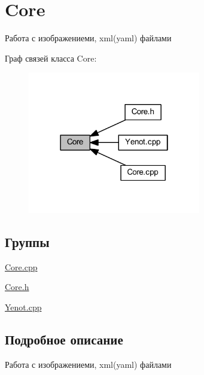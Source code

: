 \hypertarget{group__core}{}\section{Core}
\label{group__core}


Работа с изображениеми, xml(yaml) файлами  


Граф связей класса Core\+:
\nopagebreak
\begin{figure}[H]
\begin{center}
\leavevmode
\includegraphics[width=214pt]{group__core}
\end{center}
\end{figure}
\subsection*{Группы}
\begin{DoxyCompactItemize}
\item 
\mbox{\hyperlink{group__corecpp}{Core.\+cpp}}
\item 
\mbox{\hyperlink{group__coreh}{Core.\+h}}
\item 
\mbox{\hyperlink{group__yenotcpp}{Yenot.\+cpp}}
\end{DoxyCompactItemize}


\subsection{Подробное описание}
Работа с изображениеми, xml(yaml) файлами 

